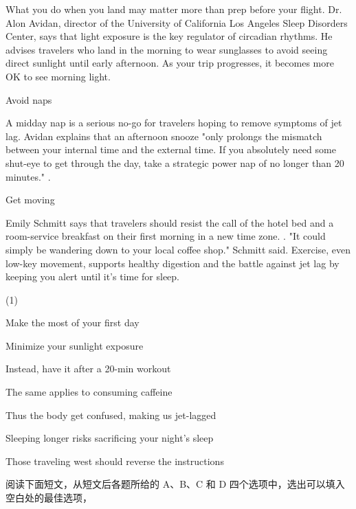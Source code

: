 \documentclass{英语试卷}
\begin{document}
\par {}\par
\par What you do when you land may matter more than prep before your flight. Dr. Alon Avidan, director of the University of California Los Angeles Sleep Disorders Center, says that light exposure is the key regulator of circadian rhythms. He advises travelers who land in the morning to wear sunglasses to avoid seeing direct sunlight until early afternoon. As your trip progresses, it becomes more OK to see morning light.\par
\par Avoid naps\par
\par A midday nap is a serious no-go for travelers hoping to remove symptoms of jet lag. Avidan explains that an afternoon snooze "only prolongs the mismatch between your internal time and the external time. If you absolutely need some shut-eye to get through the day, take a strategic power nap of no longer than 20 minutes." .\par
\par Get moving\par
\par Emily Schmitt says that travelers should resist the call of the hotel bed and a room-service breakfast on their first morning in a new time zone. . "It could simply be wandering down to your local coffee shop." Schmitt said. Exercise, even low-key movement, supports healthy digestion and the battle against jet lag by keeping you alert until it's time for sleep.\par
\begin{choices}(1)
  \item Make the most of your first day
  \item Minimize your sunlight exposure
  \item Instead, have it after a 20-min workout
  \item The same applies to consuming caffeine
  \item Thus the body get confused, making us jet-lagged
  \item Sleeping longer risks sacrificing your night's sleep
  \item Those traveling west should reverse the instructions
\end{choices}
\par 阅读下面短文，从短文后各题所给的 A、B、C 和 D 四个选项中，选出可以填入空白处的最佳选项，\par
\end{document}
